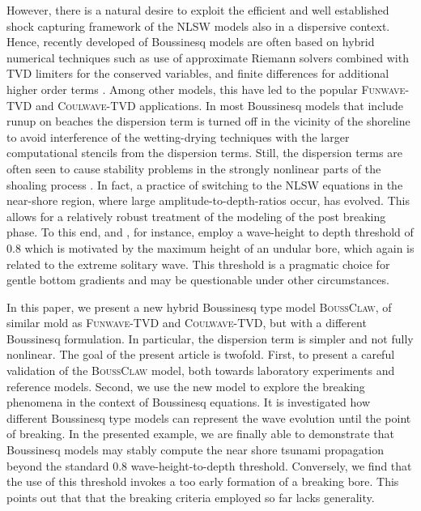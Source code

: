 \documentclass[review]{elsarticle}
\newcommand{\BoussClaw}{\textsc{BoussClaw} }
\newcommand{\BoussClawt}{\textsc{BoussClaw}}
\begin{document}
However, there is a natural desire to exploit the efficient and well established shock capturing framework of the NLSW models also in a dispersive context.
Hence, recently developed of  Boussinesq models are often based on hybrid numerical techniques
such as use of approximate Riemann solvers combined with TVD limiters for the conserved variables, and finite differences
for additional higher order terms \citep{Erduran2005,Kim2009,Shiach:2009,Roeber:2010,Dutykh:2011,shi2012high}. Among other models, this have led to the popular
\textsc{Funwave-TVD} and \textsc{Coulwave-TVD} applications. 
In most Boussinesq models that include runup on beaches the dispersion term
is turned off in the vicinity of the shoreline to avoid interference of
the wetting-drying techniques with the
larger computational stencils from the dispersion terms. Still,
the dispersion terms are often seen to cause stability problems in
the strongly nonlinear parts of the shoaling process \citep{Lovholt:2013a}.
In fact, a practice of  
switching to the NLSW equations in the near-shore region, where large amplitude-to-depth-ratios occur, has evolved.
This allows for a relatively robust treatment of the modeling of the post breaking phase. To this end, \cite{tonelli2009hybrid} and \cite{shi2012high}, for instance, employ a wave-height to depth threshold of $0.8$  which is motivated by the maximum 
height of an undular bore, which again is related to the extreme solitary wave.
This threshold is a pragmatic choice for gentle   bottom gradients and
may be questionable under other circumstances.  

In this paper, we present a new hybrid Boussinesq type model \BoussClawt, 
of similar mold as \textsc{Funwave-TVD} and \textsc{Coulwave-TVD}, but with a different Boussinesq formulation. In particular, the dispersion term is simpler
and not fully nonlinear. The goal of the present article is twofold.
First, to present a careful validation of the \BoussClaw model, both towards  
laboratory experiments and reference models. Second, we use the new model
to explore the breaking phenomena in the context of Boussinesq equations.
It is investigated how different Boussinesq type models 
can represent the wave evolution until the point of breaking. In the presented example,
we are finally able to demonstrate that Boussinesq models may stably
compute the near shore tsunami propagation beyond the standard $0.8$ wave-height-to-depth threshold.
Conversely, we find that the use of this threshold  
invokes a too early formation of a breaking bore. This points out that  
that the breaking criteria employed so far lacks generality.
\end{document}
